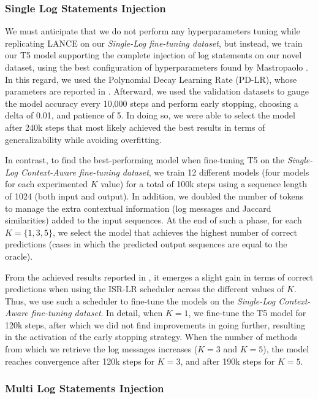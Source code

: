 \subsubsection{Single Log Statements Injection}

We must anticipate that we do not perform any hyperparameters tuning while replicating LANCE on our \textit{Single-Log fine-tuning dataset}, but instead, we train our T5 model supporting the complete injection of log statements on our novel dataset, using the best configuration of hyperparameters found by Mastropaolo \etal \cite{mastropaolo2022using}. In this regard, we used the Polynomial Decay Learning Rate (PD-LR), whose parameters are reported in . Afterward, we used the validation datasets to gauge the model accuracy every 10,000 steps and perform early stopping, choosing a delta of 0.01, and patience of 5. In doing so, we were able to select the model after 240k steps that most likely achieved the best results in terms of generalizability while avoiding overfitting.

In contrast, to find the best-performing model when fine-tuning T5 on the \textit{Single-Log Context-Aware fine-tuning dataset}, we train 12 different models (\ie four models for each experimented $K$ value) for a total of 100k steps using a sequence length of 1024 (both input and output). In addition, we doubled the number of tokens to manage the extra contextual information (\ie log messages and Jaccard similarities) added to the input sequences. At the end of such a phase, for each $K=\{1,3,5\}$, we select the model that achieves the highest number of correct predictions (\ie cases in which the predicted output sequences are equal to the oracle).

From the achieved results reported in , it emerges a slight gain in terms of correct predictions when using the ISR-LR scheduler across the different values of $K$. Thus, we use such a scheduler to fine-tune the models on the	\textit{Single-Log Context-Aware fine-tuning dataset}. In detail, when $K=1$, we fine-tune the T5 model for 120k steps, after which we did not find improvements in going further, resulting in the activation of the early stopping strategy. When the number of methods from which we retrieve the log messages increases (\ie $K=3$ and $K=5$), the model reaches convergence after 120k steps for $K=3$, and after 190k steps for $K=5$.

\subsubsection{Multi Log Statements Injection}

